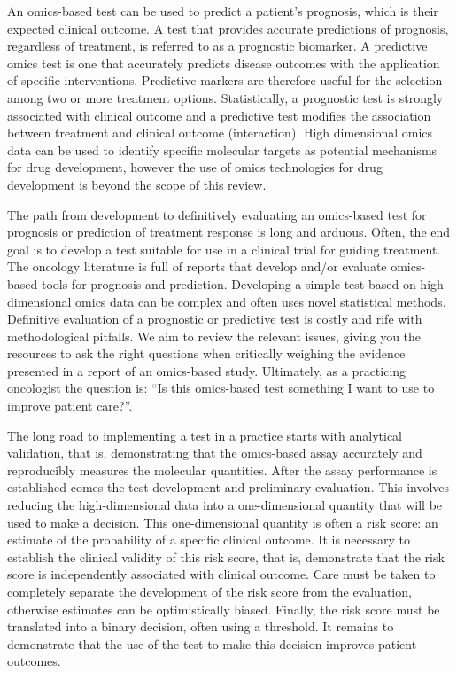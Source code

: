 \documentclass[11pt]{article}
\begin{document}
An omics-based test can be used to predict a patient's prognosis, which
is their expected clinical outcome. A test that provides accurate
predictions of prognosis, regardless of treatment, is referred to as a
prognostic biomarker. A predictive omics test is one that accurately
predicts disease outcomes with the application of specific
interventions. Predictive markers are therefore useful for the selection
among two or more treatment options. Statistically, a prognostic test is
strongly associated with clinical outcome and a predictive test modifies
the association between treatment and clinical outcome (interaction).
High dimensional omics data can be used to identify specific molecular
targets as potential mechanisms for drug development, however the use of
omics technologies for drug development is beyond the scope of this
review.

The path from development to definitively evaluating an omics-based test
for prognosis or prediction of treatment response is long and arduous.
Often, the end goal is to develop a test suitable for use in a clinical
trial for guiding treatment. The oncology literature is full of reports
that develop and/or evaluate omics-based tools for prognosis and
prediction. Developing a simple test based on high-dimensional omics
data can be complex and often uses novel statistical methods. Definitive
evaluation of a prognostic or predictive test is costly and rife with
methodological pitfalls. We aim to review the relevant issues, giving
you the resources to ask the right questions when critically weighing
the evidence presented in a report of an omics-based study. Ultimately,
as a practicing oncologist the question is: ``Is this omics-based test
something I want to use to improve patient care?''.

The long road to implementing a test in a practice starts with
analytical validation, that is, demonstrating that the omics-based assay
accurately and reproducibly measures the molecular quantities. After the
assay performance is established comes the test development and
preliminary evaluation. This involves reducing the high-dimensional data
into a one-dimensional quantity that will be used to make a decision.
This one-dimensional quantity is often a risk score: an estimate of the
probability of a specific clinical outcome. It is necessary to establish
the clinical validity of this risk score, that is, demonstrate that the
risk score is independently associated with clinical outcome. Care must
be taken to completely separate the development of the risk score from
the evaluation, otherwise estimates can be optimistically biased.
Finally, the risk score must be translated into a binary decision, often
using a threshold. It remains to demonstrate that the use of the test to
make this decision improves patient outcomes.
\end{document}
